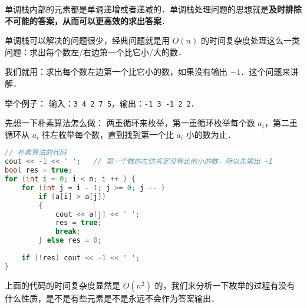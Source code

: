 

单调栈内部的元素都是单调递增或者递减的．单调栈处理问题的思想就是\textbf{及时排除不可能的答案，从而可以更高效的求出答案}．

单调栈可以解决的问题很少，经典问题就是用 $O(n)$ 的时间复杂度处理这么一类问题：求出每个数左/右边第一个比它小/大的数．

我们就用：求出每个数左边第一个比它小的数，如果没有输出 $-1$．这个问题来讲解．

举个例子：
输入：\verb|3 4 2 7 5|，输出：\verb|-1 3 -1 2 2|．

先想一下朴素算法怎么做：
两重循环来枚举，第一重循环枚举每个数 $a_i$，第二重循环从 $a_i$ 往左枚举每个数，直到找到第一个比 $a_i$ 小的数为止．

\begin{lstlisting}[language=cpp]
// 朴素算法的代码
cout << -1 << ' ';   // 第一个数的左边肯定没有比他小的数，所以先输出 -1
bool res = true;
for (int i = 0; i < n; i ++ ) {
    for (int j = i - 1; j >= 0; j -- )
        if (a[i] > a[j])
        {
            cout << a[j] << ' ';
            res = true;
            break;
        } else res = 0;
    
    if (!res) cout << -1 << ' ';
}
\end{lstlisting}

上面的代码的时间复杂度显然是 $O(n^2)$ 的，我们来分析一下枚举的过程有没有什么性质，是不是有些元素是不是永远不会作为答案输出．